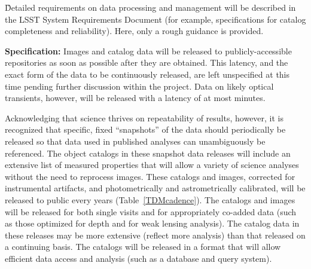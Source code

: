 \G{Detailed requirements on data processing and management will be described
in the LSST System Requirements Document (for example, specifications for catalog completeness
and reliability)}. Here, only a rough guidance is provided. 

{\bf Specification:} Images and catalog data will be released to
publicly-accessible repositories as soon as possible after they are
obtained. This latency, and the exact form of the data to be continuously
released, are left unspecified at this time pending further discussion
within the project. Data on likely optical transients, however, will be
released with a latency of at most
minutes.

Acknowledging that science thrives on repeatability of results, however, it
is recognized that specific, fixed ``snapshots'' of the data should
periodically be released so that data used in published analyses can
unambiguously be referenced. The object catalogs in these snapshot data
releases will include an extensive list of measured properties that will
allow a variety of science analyses without the need to reprocess
images. These catalogs and images, corrected for instrumental artifacts,
and photometrically and astrometrically calibrated, will be released to
public every
years (Table~\ref{TDMcadence}). The catalogs and images will be released
for both single visits and for appropriately co-added data (such as those
optimized for depth and for weak lensing analysis). The catalog data in
these releases may be more extensive (\ie reflect more analysis)
than that released on a continuing basis. The catalogs will be released in
a format that will allow efficient data access and analysis (such as a
database and query system).

